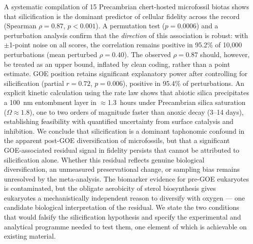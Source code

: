 \documentclass[11pt]{article}
\begin{document}
A systematic compilation of 15 Precambrian chert-hosted microfossil biotas shows that silicification
is the dominant predictor of cellular fidelity across the record (Spearman $\rho = 0.87$,
$p < 0.001$). A permutation test ($p = 0.0006$) and a perturbation analysis confirm that the
\emph{direction} of this association is robust: with $\pm$1-point noise on all scores, the
correlation remains positive in 95.2\% of 10{,}000 perturbations (mean perturbed $\rho = 0.40$).
The observed $\rho = 0.87$ should, however, be treated as an upper bound, inflated by clean coding,
rather than a point estimate. GOE position retains significant explanatory power after controlling
for silicification (partial $r = 0.72$, $p = 0.006$), positive in 95.4\% of perturbations. An
explicit kinetic calculation using the \citet{Rimstidt1980} rate law shows that abiotic silica
precipitates a 100~nm entombment layer in $\approx$1.3~hours under Precambrian silica saturation
($\Omega \approx 1.8$), one to two orders of magnitude faster than anoxic decay (3--14 days),
establishing feasibility with quantified uncertainty from surface catalysis and inhibition. We
conclude that silicification is a dominant taphonomic confound in the apparent post-GOE
diversification of microfossils, but that a significant GOE-associated residual signal in fidelity
persists that cannot be attributed to silicification alone. Whether this residual reflects genuine
biological diversification, an unmeasured preservational change, or sampling bias remains unresolved
by the meta-analysis. The biomarker evidence for pre-GOE eukaryotes is contaminated, but the
obligate aerobicity of sterol biosynthesis gives eukaryotes a mechanistically independent reason to
diversify with oxygen --- one candidate biological interpretation of the residual. We state the two
conditions that would falsify the silicification hypothesis and specify the experimental and
analytical programme needed to test them, one element of which is achievable on existing material.
\end{document}
